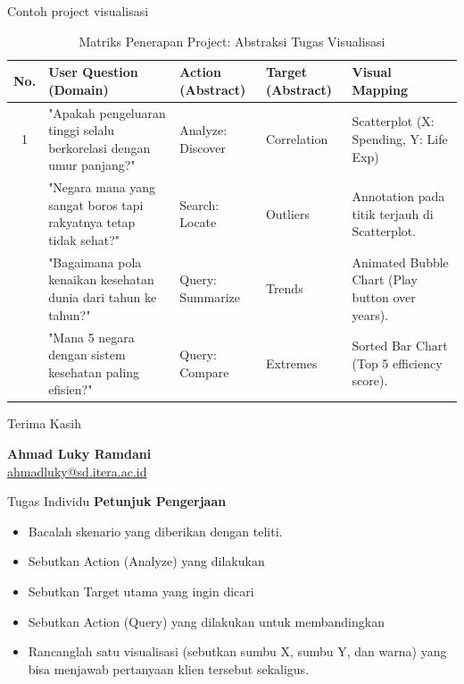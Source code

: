 \documentclass[t]{beamer}
\begin{document}

\begin{frame}{Contoh project visualisasi}
\begin{table}[h]
    \centering
    \tiny
    \caption{Matriks Penerapan Project: Abstraksi Tugas Visualisasi}
    \vspace{0.3cm}
    \begin{tabularx}{\textwidth}{@{} c >{\RaggedRight\arraybackslash}X l l >{\RaggedRight\arraybackslash}X @{}}
        \toprule
        \textbf{No.} & \textbf{User Question (Domain)} & \textbf{Action (Abstract)} & \textbf{Target (Abstract)} & \textbf{Visual Mapping} \\ 
        \midrule
        1 & "Apakah pengeluaran tinggi selalu berkorelasi dengan umur panjang?" & Analyze: Discover & Correlation & Scatterplot (X: Spending, Y: Life Exp) \\ \addlinespace
        2 & "Negara mana yang sangat boros tapi rakyatnya tetap tidak sehat?" & Search: Locate & Outliers & Annotation pada titik terjauh di Scatterplot. \\ \addlinespace
        3 & "Bagaimana pola kenaikan kesehatan dunia dari tahun ke tahun?" & Query: Summarize & Trends & Animated Bubble Chart (Play button over years). \\ \addlinespace
        4 & "Mana 5 negara dengan sistem kesehatan paling efisien?" & Query: Compare & Extremes & Sorted Bar Chart (Top 5 efficiency score). \\ 
        \bottomrule
    \end{tabularx}
\end{table}
\end{frame}


\begin{frame}[c]
    \centering
    \Huge{Terima Kasih} %
    
    \vspace{1.5cm}
    \normalsize
    \textbf{Ahmad Luky Ramdani} \\ %
    \href{mailto:ahmadluky@sd.itera.ac.id}{ahmadluky@sd.itera.ac.id} %
\end{frame}

\begin{frame}{Tugas Individu}
\textbf{Petunjuk Pengerjaan}
\begin{itemize}
    \item Bacalah skenario yang diberikan dengan teliti.
    \item Sebutkan Action (Analyze) yang dilakukan
    \item Sebutkan Target utama yang ingin dicari
    \item Sebutkan Action (Query) yang dilakukan untuk membandingkan
    \item Rancanglah satu visualisasi (sebutkan sumbu X, sumbu Y, dan warna) yang bisa menjawab pertanyaan klien tersebut sekaligus.
\end{itemize}
\end{frame}
\end{document}
